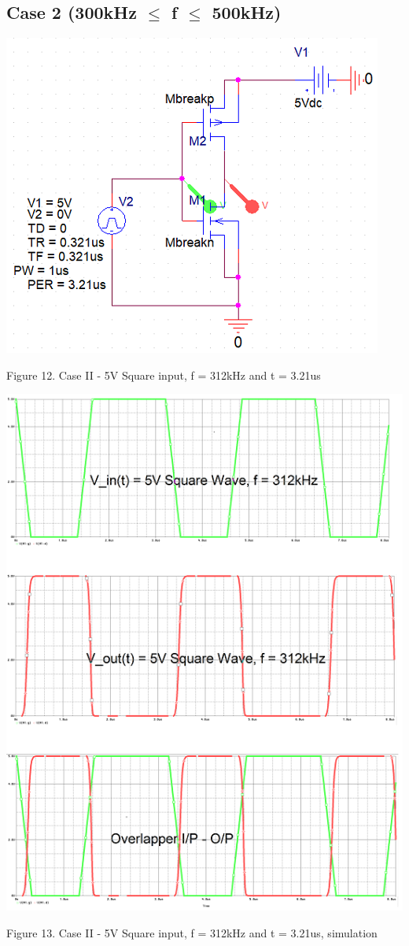\documentclass[conference]{IEEEtran}
\begin{document}
\subsection{Case 2 (300kHz $\leq$ f $\leq$ 500kHz)}

\begin{center}
    \centerline{\includegraphics[scale = 0.7]{figures/case2_circuit.png}}
    Figure 12. Case II - 5V Square input, f = 312kHz and t = 3.21us
\end{center}

\begin{center}
    \centerline{\includegraphics[scale = 0.5]{figures/case2_results1.png}}
    Figure 13. Case II - 5V Square input, f = 312kHz and t = 3.21us, simulation
\end{center}
\end{document}
